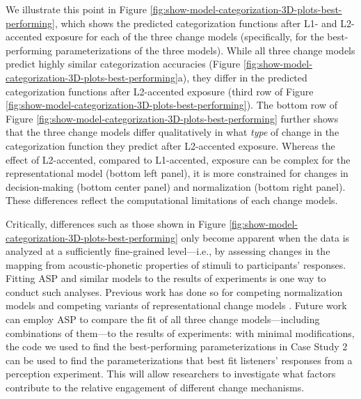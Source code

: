 \documentclass[
  11pt,
  man,floatsintext]{apa6}
\begin{document}
We illustrate this point in Figure \ref{fig:show-model-categorization-3D-plots-best-performing}, which shows the predicted categorization functions after L1- and L2-accented exposure for each of the three change models (specifically, for the best-performing parameterizations of the three models). While all three change models predict highly similar categorization accuracies (Figure \ref{fig:show-model-categorization-3D-plots-best-performing}a), they differ in the predicted categorization functions after L2-accented exposure (third row of Figure \ref{fig:show-model-categorization-3D-plots-best-performing}). The bottom row of Figure \ref{fig:show-model-categorization-3D-plots-best-performing} further shows that the three change models differ qualitatively in what \emph{type} of change in the categorization function they predict after L2-accented exposure. Whereas the effect of L2-accented, compared to L1-accented, exposure can be complex for the representational model (bottom left panel), it is more constrained for changes in decision-making (bottom center panel) and normalization (bottom right panel). These differences reflect the computational limitations of each change models.

Critically, differences such as those shown in Figure \ref{fig:show-model-categorization-3D-plots-best-performing} only become apparent when the data is analyzed at a sufficiently fine-grained level---i.e., by assessing changes in the mapping from acoustic-phonetic properties of stimuli to participants' responses. Fitting ASP and similar models to the results of experiments is one way to conduct such analyses. Previous work has done so for competing normalization models \autocites[see, e.g.,][]{mcmurray-jongman2011,apfelbaum-mcmurray2015,persson-jaeger2022,richter2017,xie2021cognition} and competing variants of representational change models \autocites[e.g.,][]{harmon2019,kleinschmidt-jaeger2016cogsci,kleinschmidt2020,tan2022}. Future work can employ ASP to compare the fit of all three change models---including combinations of them---to the results of experiments: with minimal modifications, the code we used to find the best-performing parameterizations in Case Study 2 can be used to find the parameterizations that best fit listeners' responses from a perception experiment. This will allow researchers to investigate what factors contribute to the relative engagement of different change mechanisms.
\end{document}
